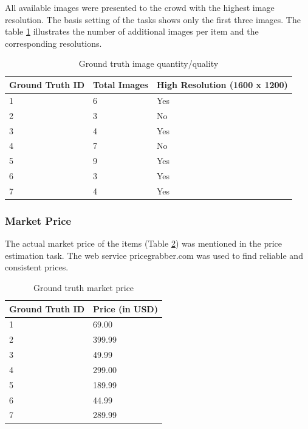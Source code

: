 All available images were presented to the crowd with the highest image resolution. The basis setting of the tasks shows only the first three images. The table \ref{tab:res_img} illustrates the number of additional images per item and the corresponding resolutions.
\begin{table}[h!]
	\begin{center}
	\begin{tabular}{| p{4.33cm} | p{4.33cm} | p{4.33cm} |}
		\hline
		\textbf{Ground Truth ID} & \textbf{Total Images} & \textbf{High Resolution (1600 x 1200)} \\
		\hline
		1 & 6 & Yes \\
		\hline
		2 & 3 & No \\
		\hline
		3 & 4 & Yes \\
		\hline
		4 & 7 & No \\
		\hline
		5 & 9 & Yes \\
		\hline
		6 & 3 & Yes \\
		\hline
		7 & 4 & Yes \\
		\hline
	\end{tabular}
	\end{center}
	\caption{Ground truth image quantity/quality}
	\label{tab:res_img}
\end{table}
\subsubsection{Market Price}
The actual market price of the items (Table \ref{tab:market_prices}) was mentioned in the price estimation task. The web service pricegrabber.com was used to find reliable and consistent prices. 
\begin{table}[h!]
	\begin{center}
	\begin{tabular}{| p{6.5cm} | p{6.5cm} |}
		\hline
		\textbf{Ground Truth ID} & \textbf{Price (in USD)} \\
		\hline
		1 & 69.00 \\
		\hline
		2 & 399.99 \\
		\hline
		3 & 49.99 \\
		\hline
		4 & 299.00 \\
		\hline
		5 & 189.99 \\
		\hline
		6 & 44.99 \\
		\hline
		7 & 289.99 \\
		\hline
	\end{tabular}
	\end{center}
	\caption{Ground truth market price}
	\label{tab:market_prices}
\end{table}

